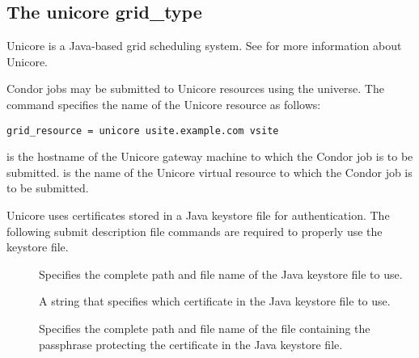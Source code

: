 
\subsection{\label{sec:Unicore}The unicore grid\_type }

Unicore is a Java-based grid scheduling system.
See  for more information about Unicore.

Condor jobs may be submitted to
Unicore resources using the  universe.
The  command specifies the name of the
Unicore resource as follows:
\begin{verbatim}
grid_resource = unicore usite.example.com vsite
\end{verbatim}
 is the hostname of the Unicore gateway
machine to which the Condor job is to be submitted.
 is the name of the Unicore virtual resource to which
the Condor job is to be submitted.

Unicore uses certificates stored in a Java keystore file for
authentication. 
The following submit description file commands
are required to properly use the keystore file.

\begin{description}
\item[] 
  Specifies the complete path and file name of the Java keystore file to use. 
\item[] 
  A string that specifies which certificate in the
  Java keystore file to use. 
\item[]
  Specifies the complete path and file name of the 
  file containing the passphrase protecting the certificate in the  
  Java keystore file.
\end{description}
